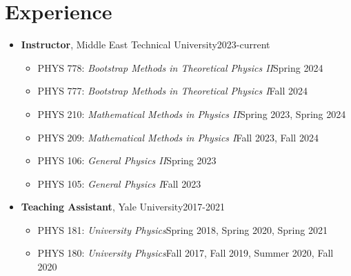 \documentclass[a4paper,11pt]{article}
\begin{document}
\section{\textcolor{burntorange}{Experience}}
\begin{itemize}[noitemsep,nolistsep] 
	\item[] \textbf{Instructor}, Middle East Technical University\hfill 2023-current
\vspace*{-.3em}
\begin{itemize}
	\item[] PHYS 778: \emph{Bootstrap Methods in Theoretical Physics II}\hfill Spring 2024\hspace*{2.2em}\vspace*{-.3em}
	\item[] PHYS 777: \emph{Bootstrap Methods in Theoretical Physics I}\hfill Fall 2024\hspace*{2.2em}\vspace*{-.3em}
	\item[] PHYS 210: \emph{Mathematical Methods in Physics II}\hfill Spring 2023, Spring 2024\hspace*{2.2em}\vspace*{-.3em}
	\item[] PHYS 209: \emph{Mathematical Methods in Physics I}\hfill Fall 2023, Fall 2024\hspace*{2.2em}\vspace*{-.3em}
	\item[] PHYS 106: \emph{General Physics II}\hfill Spring 2023\hspace*{2.2em}\vspace*{-.3em}
	\item[] PHYS 105: \emph{General Physics I}\hfill Fall 2023\hspace*{2.2em}\vspace*{-.3em}
\end{itemize} 
	\item[] \textbf{Teaching Assistant}, Yale University\hfill 2017-2021
	\vspace*{-.3em}
	\begin{itemize}
		\item[] PHYS 181: \emph{University Physics}\hfill Spring 2018, Spring 2020, Spring 2021\hspace*{2.2em}\vspace*{-.3em}
		\item[] PHYS 180: \emph{University Physics}\hfill Fall 2017, Fall 2019, Summer 2020, Fall 2020\hspace*{2.2em}\vspace*{-.3em}

\end{itemize}
\end{itemize}
\end{document}
